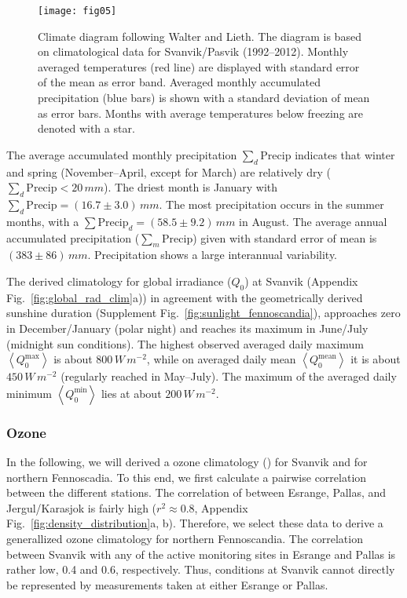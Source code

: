 \documentclass[bg, manuscript]{copernicus}
\begin{document}
\begin{figure}[t]
  \texttt{[image: fig05]}
  \caption{Climate diagram following Walter and Lieth. The diagram is based on climatological data for Svanvik/Pasvik (1992--2012). Monthly averaged temperatures (red line) are displayed with standard error of the mean as error band. Averaged monthly accumulated precipitation (blue bars) is shown with a standard deviation of mean as error bars. Months with average temperatures below freezing are denoted with a star.}
  \label{fig:climatediagram}
\end{figure}

The average accumulated monthly precipitation $\sum_d\mathrm{Precip}$ indicates that winter and spring (November--April, except for March) are relatively dry ($\sum_d\mathrm{Precip} < 20\,\unit{mm}$). The driest month is January with $\sum_d\mathrm{Precip} = (16.7\pm 3.0)\,\unit{mm}$. The most precipitation occurs in the summer months, with a $\sum\mathrm{Precip}_d = (58.5\pm 9.2)\,\unit{mm}$ in August. The average annual accumulated precipitation ($\sum_m\mathrm{Precip}$) given with standard error of mean is $(383\pm 86)\,\unit{mm}$. Precipitation shows a large interannual variability.

The derived climatology for global irradiance ($Q_0$) at Svanvik (Appendix Fig.~\ref{fig:global_rad_clim}a)) in agreement with the geometrically derived sunshine duration (Supplement Fig.~\ref{fig:sunlight_fennoscandia}), approaches zero in December/January (polar night) and reaches its maximum in June/July (midnight sun conditions). The highest observed averaged daily maximum $\left<Q_0^\mathrm{max}\right>$ is about $800\,\unit{W\,m^{-2}}$, while on averaged daily mean $\left<Q_0^\mathrm{mean}\right>$ it is about $450\,\unit{W\,m^{-2}}$ (regularly reached in May--July). The maximum of the averaged daily minimum $\left<Q_0^\mathrm{min}\right>$ lies at about $200\,\unit{W\,m^{-2}}$.


\subsubsection{Ozone}
\label{subsubsec:clim_ozone}
In the following, we will derived a ozone climatology (\chem{\left<[O_3]\right>}) for Svanvik and for northern Fennoscadia. To this end, we first calculate a pairwise correlation between the different stations. The correlation of \chem{[O_3]} between Esrange, Pallas, and Jergul/Karasjok is fairly high ($r^2\approx 0.8$, Appendix Fig.~\ref{fig:density_distribution}a, b). Therefore, we select these data to derive a generallized ozone climatology for northern Fennoscandia. The correlation between Svanvik with any of the active monitoring sites in Esrange and Pallas is rather low, 0.4 and 0.6, respectively. Thus, conditions at Svanvik cannot directly be represented by measurements taken at either Esrange or Pallas.
\end{document}
